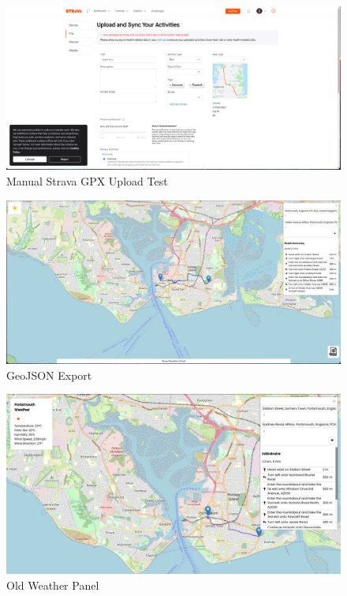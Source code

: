 \begin{figure}[!ht]
    \centering
    \includegraphics[width=425px]{figures/Progress Images/Iteration-1/SR12/SR13 GPX Successful upload Strava (manual).png}
    \caption{Manual Strava GPX Upload Test}
\end{figure}

\begin{figure}[!ht]
    \centering
    \includegraphics[width=425px]{figures/Progress Images/Iteration-1/SR12/SR14 GeoJSON Export.png}
    \caption{GeoJSON Export}
\end{figure}

\begin{figure}[!ht]
    \centering
    \includegraphics[width=425px]{figures/Progress Images/Iteration-1/SR19/Basic Weather Panel.png}
    \caption{Old Weather Panel}
\end{figure}

